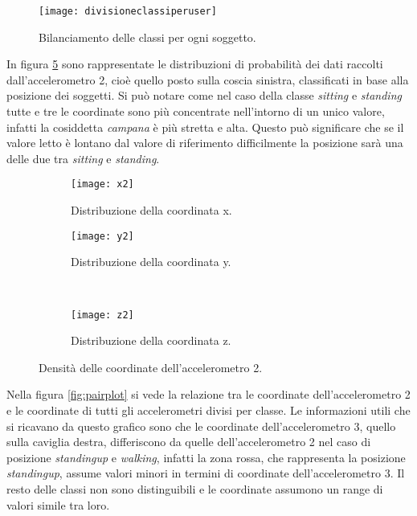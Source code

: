 \begin{figure}[h]
    \centering\texttt{[image: divisioneclassiperuser]}
    \caption{Bilanciamento delle classi per ogni soggetto.}
    \label{fig:classiusers}
\end{figure}

In figura \ref{fig:kde} sono rappresentate le distribuzioni di probabilità dei dati raccolti dall'accelerometro 2, cioè quello posto sulla coscia sinistra, classificati in base alla posizione dei soggetti. Si può notare come nel caso della classe \textit{sitting} e \textit{standing} tutte e tre le coordinate sono più concentrate nell'intorno di un unico valore, infatti la cosiddetta \textit{campana} è più stretta e alta. Questo può significare che se il valore letto è lontano dal valore di riferimento difficilmente la posizione sarà una delle due tra \textit{sitting} e \textit{standing}.

\begin{figure}[h]
    \centering
    \begin{subfigure}[t]{0.4\textwidth}
        \centering\texttt{[image: x2]}
        \caption{Distribuzione della coordinata x.}
        \label{fig:kde:x2}
    \end{subfigure}
    \begin{subfigure}[t]{0.4\textwidth}
        \centering\texttt{[image: y2]}
        \caption{Distribuzione della coordinata y.}
        \label{fig:kde:y2}
    \end{subfigure}
    \\
    \begin{subfigure}[t]{0.4\textwidth}
        \centering\texttt{[image: z2]}
        \caption{Distribuzione della coordinata z.}
        \label{fig:kde:z2}
    \end{subfigure}
    \caption{Densità delle coordinate dell'accelerometro 2.}
    \label{fig:kde}
\end{figure}

Nella figura \ref{fig:pairplot} si vede la relazione tra le coordinate dell'accelerometro 2 e le coordinate di tutti gli accelerometri divisi per classe. Le informazioni utili che si ricavano da questo grafico sono che le coordinate dell'accelerometro 3, quello sulla caviglia destra, differiscono da quelle dell'accelerometro 2 nel caso di posizione \textit{standingup} e \textit{walking}, infatti la zona rossa, che rappresenta la posizione \textit{standingup}, assume valori minori in termini di coordinate dell'accelerometro 3. Il resto delle classi non sono distinguibili e le coordinate assumono un range di valori simile tra loro.

